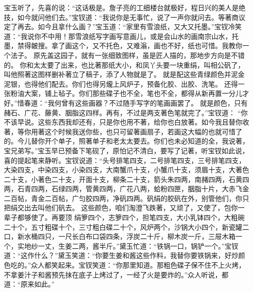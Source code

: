 \begin{parag}


    宝玉听了，先喜的说：“这话极是。詹子亮的工细楼台就极好，程日兴的美人是绝技，如今就问他们去。”宝钗道：“我说你是无事忙，说了一声你就问去。等著商议定了再去。如今且拿什么画？”宝玉道：“家里有雪浪纸，又大又托墨。”宝钗冷笑道：“我说你不中用！那雪浪纸写字画写意画儿，或是会山水的画南宗山水，托墨，禁得皴搜。拿了画这个，又不托色，又难滃，画也不好，纸也可惜。我教你一个法子。
    原先盖这园子，就有一张细致图样，虽是匠人描的，那地步方向是不错的。
    你和太太要了出来，也比著那纸大小，和凤丫头要一块重绢，叫相公矾了，叫他照著这图样删补著立了稿子，添了人物就是了。
    就是配这些青绿颜色并泥金泥银，也得他们配去。你们也得另爖上风炉子，预备化胶、出胶、洗笔。
    还得一张粉油大案，铺上毡子。你们那些碟子也不全，笔也不全，都得从新再置一分儿才好。”惜春道：“我何曾有这些画器？不过随手写字的笔画画罢了。
    就是颜色，只有赭石、广花、藤黄、胭脂这四样。再有，不过是两支著色笔就完了。”宝钗道： “你不该早说。这些东西我却还有，只是你也用不著，给你也白放著。如今我且替你收著，等你用著这个时候我送你些，也只可留著画扇子，若画这大幅的也就可惜了的。今儿替你开个单子，照著单子和老太太要去。你们也未必知道的全，我说著，宝兄弟写。”宝玉早已预备下笔砚了，原怕记不清白，要写了记著，听宝钗如此说，喜的提起笔来静听。宝钗说道：“头号排笔四支，二号排笔四支，三号排笔四支，大染四支，中染四支，小染四支，大南蟹爪十支，小蟹爪十支，须眉十支，大著色二十支，小著色二十支，开面十支，柳条二十支，箭头朱四两，南赭四两，石黄四两，石青四两，石绿四两，管黄四两，广花八两，蛤粉四匣，胭脂十片，大赤飞金二百帖，青金二百帖，广匀胶四两，净矾四两。矾绢的胶矾在外，别管他们，你只把绢交出去叫他们矾去。
    这些颜色，咱们淘澄飞跌著，又顽了，又使了，包你一辈子都够使了。再要顶 绢箩四个，志箩四个，担笔四支，大小乳钵四个，大粗碗二十个，五寸粗碟十个，三寸粗白碟二十个，风炉两个，沙锅大小四个，新瓷罐二口，新水桶四只，一尺长白布口袋四条，浮炭二十斤，柳木炭一斤，三屉木箱一个，实地纱一丈，生姜二两，酱半斤。”黛玉忙道：“铁锅一口，锅铲一个。”宝钗道：“这作什么？”黛玉笑道：“你要生姜和酱这些作料，我替你要铁锅来，好炒颜色吃的。”众人都笑起来。宝钗笑道：“你那里知道。那粗色碟子保不住不上火烤，不拿姜汁子和酱预先抹在底子上烤过了，一经了火是要炸的。”众人听说，都道：“原来如此。”
\end{parag}


